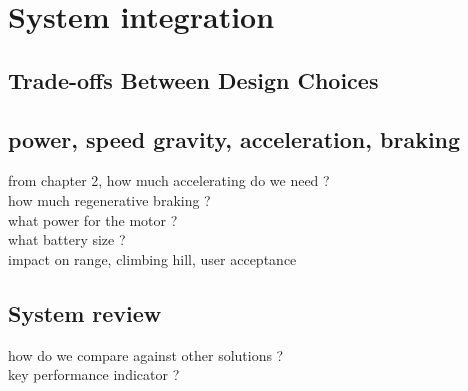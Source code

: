 \section{System integration}

\subsection{Trade-offs Between Design Choices}

\subsection{power, speed gravity, acceleration, braking}

from chapter 2, how much accelerating do we need ? \\
how much regenerative braking ?  \\
what power for the motor ? \\
what battery size ?\\
impact on range, climbing hill, user acceptance \\

\subsection{System review}
how do we compare against other solutions ?\\
key performance indicator ? \\
